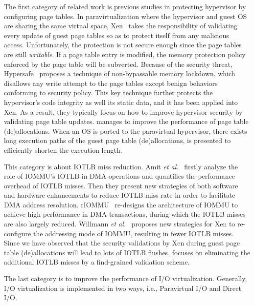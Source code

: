  The first category of related work is previous studies in protecting hypervisor by configuring page tables. In paravirtualization where the hypervisor and guest OS are sharing the same virtual space, Xen~\cite{barham2003xen} takes the responsibility of validating every update of guest page tables so as to protect itself from any malicious access. Unfortunately, the protection is not secure enough since the page tables are still \emph{writable}. If a page table entry is modified, the memory protection policy enforced by the page table will be subverted. Because of the security threat, Hypersafe~\cite{wang2010hypersafe} proposes a technique of non-bypassable memory lockdown, which disallows any write attempt to the page tables except benign behaviors conforming to security policy. This key technique further protects the hypervisor's code integrity as well its static data, and it has been applied into Xen.
As a result, they typically focus on how to improve hypervisor security by validating page table updates. \name manages to improve the performance of page table (de)allocations. When an OS is ported to the paravirtual hypervisor, there exists long execution paths of the guest page table (de)allocations, \name is presented to efficiently shorten the execution length.

 This category is about IOTLB miss reduction. Amit \emph{et al.}~\cite{amit2012iommu} firstly analyze the role of IOMMU's IOTLB in DMA operations and quantifies the performance overhead of IOTLB misses. Then they present new strategies of both software and hardware enhancements to reduce IOTLB miss rate in order to facilitate DMA address resolution. rIOMMU~\cite{malka2015riommu} re-designs the architecture of IOMMU to achieve high performance in DMA transactions, during which the IOTLB misses are also largely reduced. Willmann \emph{et al.}~\cite{willmann2008protection} proposes new strategies for Xen to re-configure the addressing mode of IOMMU, resulting in fewer IOTLB misses.
Since we have observed that the security validations by Xen during guest page table (de)allocations will lead to lots of IOTLB flushes, \name focuses on eliminating the additional IOTLB misses by a find-grained validation scheme.

 The last category is to improve the performance of I/O virtualization. Generally, I/O virtualization is implemented in two ways, i.e., Paravirtual I/O and Direct I/O.

